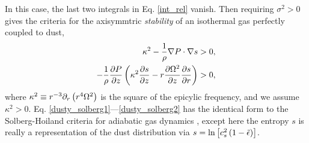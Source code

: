 In this case, the last two integrals in Eq. \ref{int_rel} vanish. Then 
requiring $\sigma^2>0$  gives the criteria 
for the axisymmtric \emph{stability} of an isothermal gas perfectly 
coupled to dust,  
\begin{align}
  \kappa^2 - \frac{1}{\rho}\nabla P \cdot \nabla s &> 0, \label{dusty_solberg1}    \\
  -\frac{1}{\rho}\frac{\partial P}{\partial z} \left(\kappa^2 \frac{\partial s}{\partial z} -
  r\frac{\partial\Omega^2}{\partial z}\frac{\partial s}{\partial r}\right) &>0, \label{dusty_solberg2}
\end{align} 
where %
$\kappa^2 \equiv r^{-3}\partial_r\left(r^4\Omega^2\right)$ is the 
square of the epicylic frequency, and we assume $\kappa^2>0$.  
Eq. \ref{dusty_solberg1}---\ref{dusty_solberg2} has the identical form
to the Solberg-Hoiland criteria for adiabatic gas dynamics 
\citep[e.g.][]{tassoul78}, except here the entropy $s$ is really a
representation of the dust distribution via $s=\ln{\left[c_s^2\left(1
    - \tilde{\epsilon}\right)\right]}$.  


